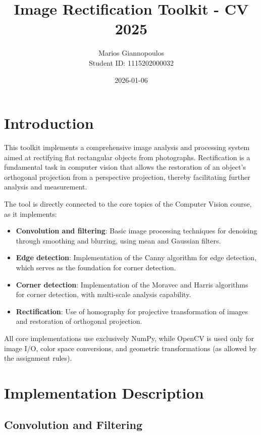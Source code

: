 \documentclass{article}
\title{Image Rectification Toolkit - CV 2025}
\author{Marios Giannopoulos\\Student ID: 1115202000032}
\date{2026-01-06}
\begin{document}
\maketitle
\tableofcontents

\section{Introduction}
\label{sec:introduction}

This toolkit implements a comprehensive image analysis and processing system aimed at rectifying flat rectangular objects from photographs. Rectification is a fundamental task in computer vision that allows the restoration of an object's orthogonal projection from a perspective projection, thereby facilitating further analysis and measurement.

The tool is directly connected to the core topics of the Computer Vision course, as it implements:

\begin{itemize}
    \item \textbf{Convolution and filtering}: Basic image processing techniques for denoising through smoothing and blurring, using mean and Gaussian filters.
    \item \textbf{Edge detection}: Implementation of the Canny algorithm for edge detection, which serves as the foundation for corner detection.
    \item \textbf{Corner detection}: Implementation of the Moravec and Harris algorithms for corner detection, with multi-scale analysis capability.
    \item \textbf{Rectification}: Use of homography for projective transformation of images and restoration of orthogonal projection.
\end{itemize}

All core implementations use exclusively NumPy, while OpenCV is used only for image I/O, color space conversions, and geometric transformations (as allowed by the assignment rules).

\section{Implementation Description}
\label{sec:implementation}

\subsection{Convolution and Filtering}
\end{document}
